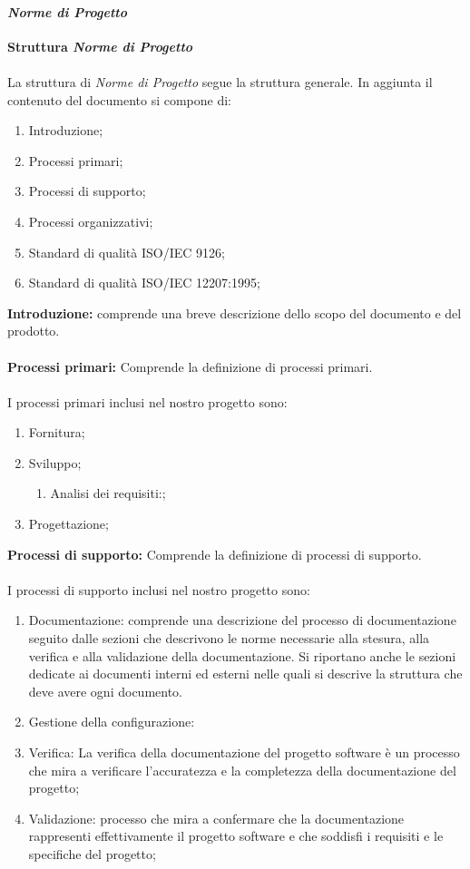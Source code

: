 \paragraph{\textit{Norme di Progetto}}
\textbf{Struttura \textit{Norme di Progetto}}
\\\\
La struttura di \textit{Norme di Progetto} segue la struttura generale.
In aggiunta il contenuto del documento si compone di:
\begin{enumerate}
    \item Introduzione;
    \item Processi primari;
    \item Processi di supporto;
    \item Processi organizzativi;
    \item Standard di qualità ISO/IEC 9126;
    \item Standard di qualità ISO/IEC 12207:1995;
\end{enumerate}
\textbf{Introduzione:} comprende una breve descrizione dello scopo del documento e del prodotto.
\\\\
\textbf{Processi primari:}
Comprende la definizione di processi primari. 
\\\\
I processi primari inclusi nel nostro progetto sono:
\begin{enumerate}
    \item Fornitura;
    \item Sviluppo;
        \begin{enumerate}
            \item Analisi dei requisiti:;
        \end{enumerate}
    \item Progettazione;
\end{enumerate}
\textbf{Processi di supporto:} 
Comprende la definizione di processi di supporto.
\\\\
I processi di supporto inclusi nel nostro progetto sono:
\begin{enumerate}
    \item Documentazione: comprende una descrizione del processo di documentazione seguito dalle sezioni che descrivono le norme necessarie alla stesura, alla verifica e 
    alla validazione della documentazione. Si riportano anche le sezioni dedicate ai documenti interni ed esterni nelle quali si descrive la struttura che deve avere ogni documento.
    \item Gestione della configurazione: 
    \item Verifica: La verifica della documentazione del progetto software è un processo che mira a verificare l'accuratezza e la completezza della documentazione del progetto;
    \item Validazione: processo che mira a confermare che la documentazione rappresenti effettivamente il progetto software e che soddisfi i requisiti e le specifiche del progetto;
\end{enumerate}

